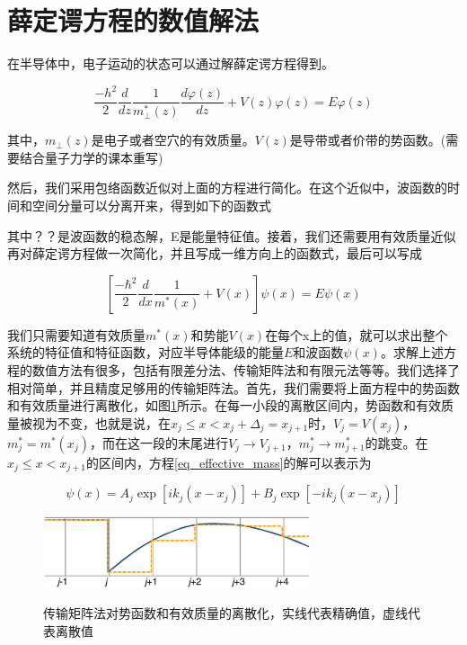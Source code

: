 \documentclass[oneside]{ZJUthesis}
\begin{document}
\section{薛定谔方程的数值解法}

在半导体中，电子运动的状态可以通过解薛定谔方程得到。

\begin{equation}
    \label{schrodinger}
    \frac{-h^2}{2} \frac{d}{dz} \frac{1}{m_\perp^*(z)} \frac{d\varphi(z)}{dz}
    +V(z)\varphi(z)
        = E\varphi(z)
\end{equation}

其中，$m_\perp(z)$是电子或者空穴的有效质量。$V(z)$是导带或者价带的势函数。(需要结合量子力学的课本重写)

然后，我们采用包络函数近似对上面的方程进行简化。在这个近似中，波函数的时间和空间分量可以分离开来，得到如下的函数式

其中？？是波函数的稳态解，E是能量特征值。接着，我们还需要用有效质量近似再对薛定谔方程做一次简化，并且写成一维方向上的函数式，最后可以写成

\begin{equation}
    \label{eq_effective_mass}
    \left[ \frac{-\hbar^2}{2} \frac{d}{dx} \frac{1}{m^*(x)} + V(x) \right] \psi(x) = E \psi(x)
\end{equation}

我们只需要知道有效质量$m^*(x)$和势能$V(x)$在每个x上的值，就可以求出整个系统的特征值和特征函数，对应半导体能级的能量$E$和波函数$\psi(x)$。求解上述方程的数值方法有很多，包括有限差分法、传输矩阵法和有限元法等等。我们选择了相对简单，并且精度足够用的传输矩阵法。首先，我们需要将上面方程中的势函数和有效质量进行离散化，如图\ref{fig_tmm}所示。在每一小段的离散区间内，势函数和有效质量被视为不变，也就是说，在$x_j\le x<x_j+\Delta_j=x_{j+1}$时，$V_j=V(x_j)$，$m^*_j=m^*(x_j)$，而在这一段的末尾进行$V_j\to V_{j+1}$，$m^*_j\to m^*_{j+1}$的跳变。在$x_j\le x<x_{j+1}$的区间内，方程\ref{eq_effective_mass}的解可以表示为

\begin{equation}
    \label{eq_effective_mass_solution}
    \psi(x) = A_j \exp [i k_j (x-x_j)] + B_j \exp [-i k_j (x-x_j)]
\end{equation}

\begin{figure}[!h]
  \centering
  \includegraphics[width=0.7\textwidth]{./Pictures/tmm.eps}\\
  \caption{传输矩阵法对势函数和有效质量的离散化，实线代表精确值，虚线代表离散值}
  \label{fig_tmm}
\end{figure}
\end{document}
